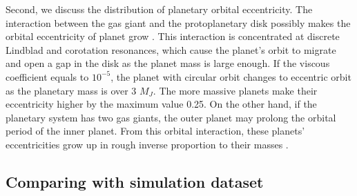 \documentclass[twocolumn, dvipdfmx]{aastex62}
\begin{document}
\begin{CJK*}{UTF8}{min}
Second, we discuss the distribution of planetary orbital eccentricity. The interaction between the gas giant and the protoplanetary disk possibly makes the orbital eccentricity of planet grow \citep{2003ApJ...585.1024G, 2006A&A...447..369K}. This interaction is concentrated at discrete Lindblad and corotation resonances, which cause the planet's orbit to migrate and open a gap in the disk as the planet mass is large enough. If the viscous coefficient equals to $10^{-5}$, the planet with circular orbit changes to eccentric orbit as the planetary mass is over 3 $M_J$. The more massive planets make their eccentricity higher by the maximum value 0.25. On the other hand, if the planetary system has two gas giants, the outer planet may prolong the orbital period of the inner planet. From this orbital interaction, these planets' eccentricities grow up in rough inverse proportion to their masses \citep{2002ApJ...564L.105C}.


\subsection{Comparing with simulation dataset}



\acknowledgments


\vspace{5mm}


\begin{thebibliography}{}


\end{thebibliography}
\end{CJK*}
\end{document}
